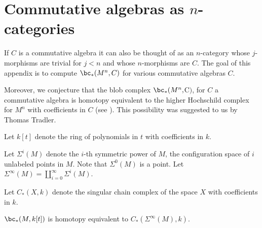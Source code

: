 
\section{Commutative algebras as \texorpdfstring{$n$}{n}-categories}
\label{sec:comm_alg}

If $C$ is a commutative algebra it
can also be thought of as an $n$-category whose $j$-morphisms are trivial for
$j<n$ and whose $n$-morphisms are $C$. 
The goal of this appendix is to compute
$\bc_*(M^n, C)$ for various commutative algebras $C$.

Moreover, we conjecture that the blob complex $\bc_*(M^n, $C$)$, for $C$ a commutative 
algebra is homotopy equivalent to the higher Hochschild complex for $M^n$ with 
coefficients in $C$ (see \cite{MR0339132, MR1755114, MR2383113}).  
This possibility was suggested to us by Thomas Tradler.


\medskip

Let $k[t]$ denote the ring of polynomials in $t$ with coefficients in $k$.

Let $\Sigma^i(M)$ denote the $i$-th symmetric power of $M$, the configuration space of $i$
unlabeled points in $M$.
Note that $\Sigma^0(M)$ is a point.
Let $\Sigma^\infty(M) = \coprod_{i=0}^\infty \Sigma^i(M)$.

Let $C_*(X, k)$ denote the singular chain complex of the space $X$ with coefficients in $k$.

\begin{prop} \label{sympowerprop}
$\bc_*(M, k[t])$ is homotopy equivalent to $C_*(\Sigma^\infty(M), k)$.
\end{prop}

